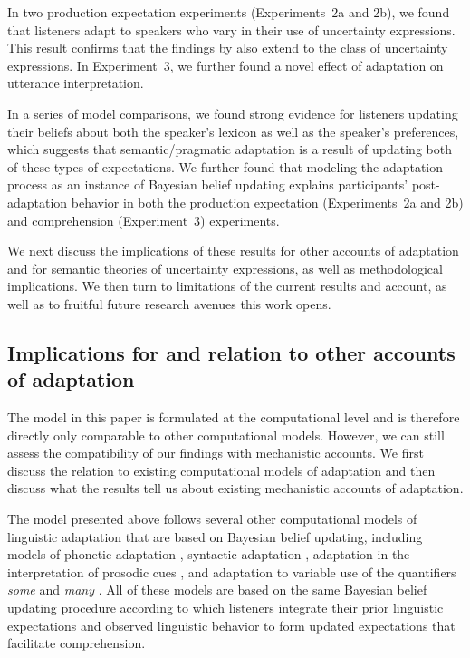 \documentclass[man, floatsintext]{apa6}
\begin{document}
In two production expectation experiments (Experiments~2a and 2b), we found that listeners adapt to speakers who vary in their use of uncertainty expressions. This result confirms that 
the findings by \textcite{Yildirim2016} also extend to the class of uncertainty expressions. In Experiment~3, we further found a novel effect of adaptation on utterance interpretation.

In a series of model comparisons, we found strong evidence for listeners updating their beliefs about both the speaker's lexicon as well as the speaker's preferences, which suggests
that semantic/pragmatic adaptation is a result of updating both of these types of expectations. We further found that modeling the adaptation process as an instance of Bayesian
belief updating explains participants' post-adaptation behavior in both the production expectation (Experiments~2a and 2b) and comprehension (Experiment~3) experiments. 


We next discuss the implications of these results for other accounts of adaptation and for semantic theories of uncertainty expressions, as well as methodological implications. We then turn to limitations of the current results and account, as well as to fruitful future research avenues this work opens. 



\subsection{Implications for and relation to other accounts of adaptation}

The model in this paper is formulated at the computational level \parencite{Marr1982,Anderson1990} 
and is therefore directly only comparable to other computational models. However, we can still assess 
the compatibility of our findings with mechanistic accounts. We first discuss the relation to existing computational 
models of adaptation and then discuss what the results tell us about existing mechanistic accounts of
 adaptation.

The model presented above follows several other computational models of linguistic adaptation that are based 
on Bayesian belief updating, including models of phonetic adaptation \parencite{Kleinschmidt2015}, syntactic 
adaptation \parencite{Kleinschmidt2012}, adaptation in the interpretation of prosodic cues \parencite{Roettger2019},
and adaptation to variable use of the quantifiers \textit{some} and \textit{many} \parencite{Qing2014}.
All of these models are based on the same Bayesian belief updating procedure according to which listeners integrate
their prior linguistic expectations and observed linguistic behavior to form updated expectations that facilitate comprehension.
\end{document}
